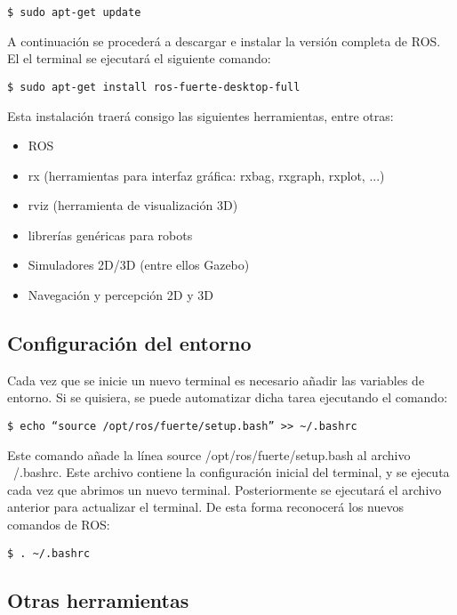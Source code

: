 \documentclass[10pt, a4paper]{report}
\begin{document}
\begin{verbatim}
$ sudo apt-get update
\end{verbatim}

A continuación se procederá a descargar e instalar la versión completa de ROS. El el terminal se ejecutará el siguiente comando:

\begin{verbatim}
$ sudo apt-get install ros-fuerte-desktop-full
\end{verbatim}

Esta instalación traerá consigo las siguientes herramientas, entre otras:

\begin{itemize}
\item ROS
\item rx (herramientas para interfaz gráfica: rxbag,  rxgraph, rxplot, ...)
\item rviz (herramienta de visualización 3D)
\item librerías genéricas para robots
\item Simuladores 2D/3D (entre ellos Gazebo)
\item Navegación y percepción 2D y 3D
\end{itemize}

\subsection{Configuración del entorno}

Cada vez que se inicie un nuevo terminal es necesario añadir las variables de entorno. Si se quisiera, se puede automatizar dicha tarea ejecutando el comando:

\begin{verbatim}
$ echo “source /opt/ros/fuerte/setup.bash” >> ~/.bashrc
\end{verbatim}

Este comando añade la línea  source /opt/ros/fuerte/setup.bash al archivo ~/.bashrc. Este archivo contiene la configuración inicial del terminal, y se ejecuta cada vez que abrimos un nuevo terminal. Posteriormente se ejecutará el archivo anterior para actualizar el terminal. De esta forma reconocerá los nuevos comandos de ROS:

\begin{verbatim}
$ . ~/.bashrc
\end{verbatim}

\subsection{Otras herramientas}
\end{document}
